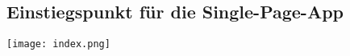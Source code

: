 \subsection{Einstiegspunkt für die Single-Page-App}
\label{app:index}
\begin{center}
\texttt{[image: index.png]}
\end{center}